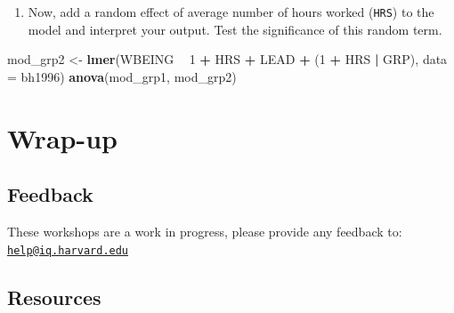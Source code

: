 \documentclass[
]{book}
\newenvironment{Shaded}{\begin{snugshade}}{\end{snugshade}}
\newcommand{\DataTypeTok}[1]{\textcolor[rgb]{0.13,0.29,0.53}{#1}}
\newcommand{\DecValTok}[1]{\textcolor[rgb]{0.00,0.00,0.81}{#1}}
\newcommand{\KeywordTok}[1]{\textcolor[rgb]{0.13,0.29,0.53}{\textbf{#1}}}
\newcommand{\NormalTok}[1]{#1}
\newcommand{\OperatorTok}[1]{\textcolor[rgb]{0.81,0.36,0.00}{\textbf{#1}}}
\newcommand{\StringTok}[1]{\textcolor[rgb]{0.31,0.60,0.02}{#1}}
\providecommand{\tightlist}{%
  \setlength{\itemsep}{0pt}\setlength{\parskip}{0pt}}
\begin{document}
\begin{enumerate}
\def\labelenumi{\arabic{enumi}.}
\setcounter{enumi}{2}
\tightlist
\item
  Now, add a random effect of average number of hours worked (\texttt{HRS}) to the model and interpret your output. Test the significance of this random term.
\end{enumerate}

\begin{Shaded}
\begin{Highlighting}[]
\NormalTok{  mod_grp2 <-}\StringTok{ }\KeywordTok{lmer}\NormalTok{(WBEING }\OperatorTok{~}\StringTok{ }\DecValTok{1} \OperatorTok{+}\StringTok{ }\NormalTok{HRS }\OperatorTok{+}\StringTok{ }\NormalTok{LEAD }\OperatorTok{+}\StringTok{ }\NormalTok{(}\DecValTok{1} \OperatorTok{+}\StringTok{ }\NormalTok{HRS }\OperatorTok{|}\StringTok{ }\NormalTok{GRP), }\DataTypeTok{data =}\NormalTok{ bh1996)}
  \KeywordTok{anova}\NormalTok{(mod_grp1, mod_grp2)}
\end{Highlighting}
\end{Shaded}

\hypertarget{wrap-up-2}{%
\section{Wrap-up}\label{wrap-up-2}}

\hypertarget{feedback-2}{%
\subsection{Feedback}\label{feedback-2}}

These workshops are a work in progress, please provide any feedback to: \href{mailto:help@iq.harvard.edu}{\nolinkurl{help@iq.harvard.edu}}

\hypertarget{resources-3}{%
\subsection{Resources}\label{resources-3}}
\end{document}
